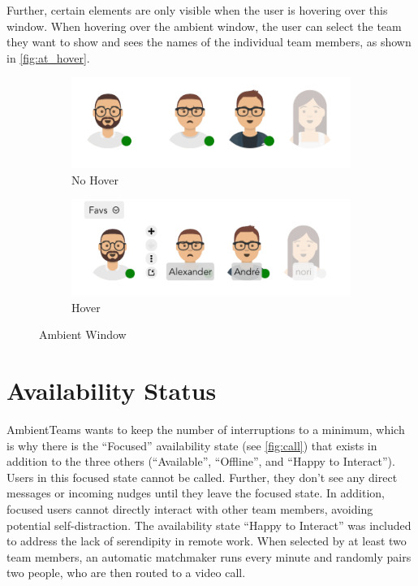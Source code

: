 Further, certain elements are only visible when the user is hovering over this window. When hovering over the ambient window, the user can select the team they want to show and sees the names of the individual team members, as shown in \autoref{fig:at_hover}.

\begin{figure}[h]
    \centering
    \begin{subfigure}{.5\textwidth}
        \centering
        \includegraphics[width=.8\linewidth]{./images/AT_no_hover.png}
        \caption{No Hover}
        \label{fig:at_no_hover}
    \end{subfigure}%
    \begin{subfigure}{.5\textwidth}
        \centering
        \includegraphics[width=.8\linewidth]{./images/AT_hover.png}
        \caption{Hover}
        \label{fig:at_hover}
    \end{subfigure}
    \caption{Ambient Window}
\end{figure}

\section{Availability Status}
AmbientTeams wants to keep the number of interruptions to a minimum, which is why there is the \enquote{Focused} availability state (see \autoref{fig:call}) that exists in addition to the three others (\enquote{Available}, \enquote{Offline}, and \enquote{Happy to Interact}). Users in this focused state cannot be called. Further, they don't see any direct messages or incoming nudges until they leave the focused state. In addition, focused users cannot directly interact with other team members, avoiding potential self-distraction. The availability state \enquote{Happy to Interact} was included to address the lack of serendipity in remote work. When selected by at least two team members, an automatic matchmaker runs every minute and randomly pairs two people, who are then routed to a video call.

